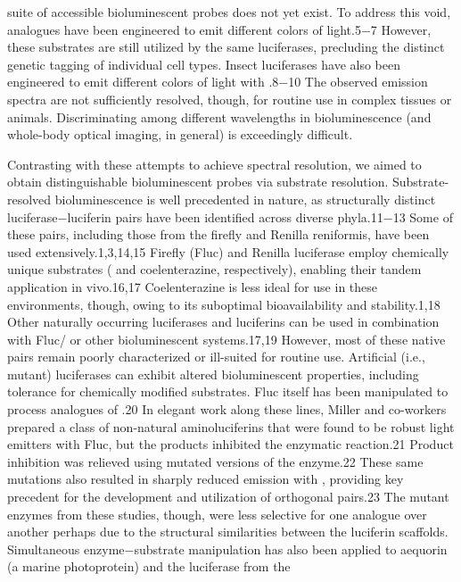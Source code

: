 suite of accessible bioluminescent probes does not yet exist. To
address this void, \dluciferin{} analogues have been engineered to
emit different colors of light.5−7 However, these substrates are
still utilized by the same luciferases, precluding the distinct
genetic tagging of individual cell types. Insect luciferases have
also been engineered to emit different colors of light with \dluciferin{}.8−10
The observed emission spectra are not sufficiently
resolved, though, for routine use in complex tissues or animals.
Discriminating among different wavelengths in bioluminescence
(and whole-body optical imaging, in general) is
exceedingly difficult.
\par
Contrasting with these attempts to achieve spectral
resolution, we aimed to obtain distinguishable bioluminescent
probes via substrate resolution. Substrate-resolved bioluminescence
is well precedented in nature, as structurally distinct
luciferase−luciferin pairs have been identified across diverse
phyla.11−13 Some of these pairs, including those from the firefly
and Renilla reniformis, have been used extensively.1,3,14,15 Firefly
(Fluc) and Renilla luciferase employ chemically unique
substrates (\dluciferin{} and coelenterazine, respectively), enabling
their tandem application in vivo.16,17 Coelenterazine is
less ideal for use in these environments, though, owing to its
suboptimal bioavailability and stability.1,18 Other naturally
occurring luciferases and luciferins can be used in combination
with Fluc/\dluciferin{} or other bioluminescent systems.17,19
However, most of these native pairs remain poorly characterized
or ill-suited for routine use.
Artificial (i.e., mutant) luciferases can exhibit altered
bioluminescent properties, including tolerance for chemically
modified substrates. Fluc itself has been manipulated to process
analogues of \dluciferin{}.20 In elegant work along these lines,
Miller and co-workers prepared a class of non-natural
aminoluciferins that were found to be robust light emitters
with Fluc, but the products inhibited the enzymatic reaction.21
Product inhibition was relieved using mutated versions of the
enzyme.22 These same mutations also resulted in sharply
reduced emission with \dluciferin{}, providing key precedent for
the development and utilization of orthogonal pairs.23 The
mutant enzymes from these studies, though, were less selective
for one analogue over another perhaps due to the structural
similarities between the luciferin scaffolds. Simultaneous enzyme−substrate manipulation has also been applied to
aequorin (a marine photoprotein) and the luciferase from the
